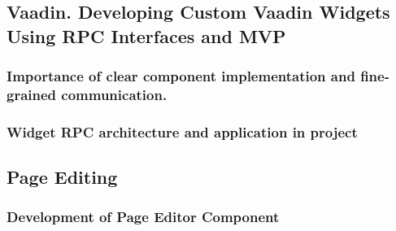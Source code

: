 \subsection{Vaadin. Developing Custom Vaadin Widgets Using RPC Interfaces and MVP}
\subsubsection{Importance of clear component implementation and fine-grained communication.}
\subsubsection{Widget RPC architecture and application in project}
\subsection{Page Editing}
\subsubsection{Development of Page Editor Component}